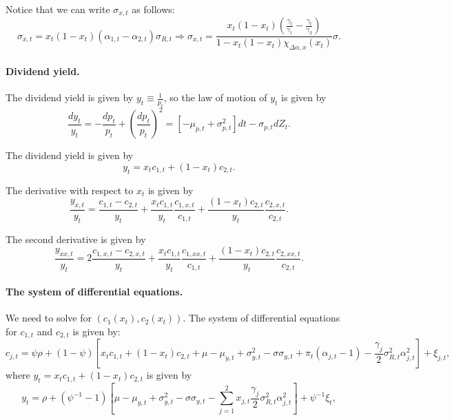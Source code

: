 \documentclass[11pt,english]{article}
\begin{document}
Notice that we can write $\sigma_{x,t}$ as follows:
\begin{equation}
    \sigma_{x,t} = x_t (1-x_t) (\alpha_{1,t}-\alpha_{2,t}) \sigma_{R,t} \Rightarrow \sigma_{x,t} = \frac{x_t (1-x_t)\left(\frac{\gamma_t}{\gamma_1} - \frac{\gamma_t}{\gamma_2} \right)}{1- x_t (1-x_t) \chi_{\Delta \alpha, x}(x_t)} \sigma.
\end{equation}

\paragraph{Dividend yield.} The dividend yield is given by $y_{t} \equiv \frac{1}{p_t}$, so the law of motion of $y_{t}$ is given by
\begin{equation}
    \frac{d y_{t}}{y_{t}} = -\frac{dp_t}{p_t} + \left( \frac{d p_t}{p_t} \right)^2 = \left[ -\mu_{p,t} +\sigma_{p,t}^2 \right] dt - \sigma_{p,t} dZ_t. 
\end{equation}

The dividend yield is given by 
\begin{equation}
    y_t = x_t c_{1,t} + (1-x_t) c_{2,t}. 
\end{equation}

The derivative with respect to $x_t$ is given by
\begin{equation}
    \frac{y_{x,t}}{y_t} = \frac{c_{1,t} - c_{2,t}}{y_t} + \frac{x_t c_{1,t}}{y_t} \frac{c_{1,x,t}}{c_{1,t}} + \frac{(1-x_t) c_{2,t}}{y_t} \frac{c_{2,x,t}}{c_{2,t}}.
\end{equation}

The second derivative is given by
\begin{equation}
    \frac{y_{xx,t}}{y_t} = 2 \frac{c_{1,x,t} - c_{2,x,t}}{y_t} + \frac{x_t c_{1,t}}{y_t} \frac{c_{1,xx,t}}{c_{1,t}} + \frac{(1-x_t) c_{2,t}}{y_t} \frac{c_{2,xx,t}}{c_{2,t}}.
\end{equation}

\paragraph{The system of differential equations.} We need to solve for $(c_1(x_t), c_{2}(x_t))$. The system of differential equations for $c_{1,t}$ and $c_{2,t}$ is given by:
\begin{equation}
    c_{j,t} = \psi \rho + (1-\psi) \left[ x_t c_{1,t} + (1-x_t) c_{2,t} + \mu - \mu_{y,t} +\sigma_{y,t}^2 - \sigma \sigma_{y,t} + \pi_t (\alpha_{j,t}-1) - \frac{\gamma_j}{2} \sigma_{R,t}^2 \alpha_{j,t}^2 \right] + \xi_{j,t},
\end{equation}
where $y_t = x_t c_{1,t} + (1-x_t) c_{2,t}$ is given by
\begin{equation}
    y_{t} =  \rho + (\psi^{-1}-1) \left[ \mu - \mu_{y,t} +\sigma_{y,t}^2 - \sigma \sigma_{y,t}  - \sum_{j=1}^2  x_{j,t}\frac{\gamma_j}{2} \sigma_{R,t}^2 \alpha_{j,t}^2 \right] + \psi^{-1}\xi_{t},
\end{equation}
\end{document}
